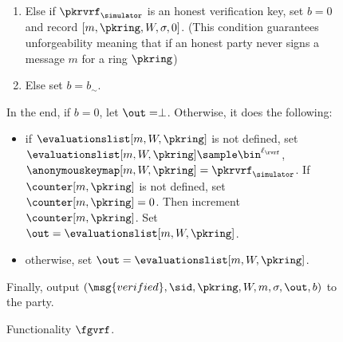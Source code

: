 \begin{figure}
\begin{tcolorbox}
{\begin{description}
\begin{enumerate}[label={{Cond.-} }{{\arabic*}}, start = 1]
					\item Else if $ \pkrvrf_\simulator $ is an honest verification key, set $ b = 0 $ and record $ [m, \pkring,W,\sigma, 0] $. (This condition guarantees unforgeability meaning that if an honest party never signs a message $ m $ for a ring $ \pkring $)\label{cond:forgery}
				\item Else set $ b = b_\sim$. \label{cond:simulatorbit}
				\end{enumerate}
				In the end, if $ b = 0 $, let $ \out = \perp $. Otherwise, it does the following:
				\begin{itemize}
					\item if $ \evaluationslist[m,W,\pkring] $ is not defined, set $ \evaluationslist[m, W, \pkring]\sample \bin^{\ell_\rvrf}$, $ \anonymouskeymap[m,W,\pkring]  =  \pkrvrf_\simulator$. If $ \counter[m, \pkring]  $ is not defined, set $ \counter[m, \pkring]  = 0 $. Then increment $ \counter[m, \pkring]  $. Set $ \out = \evaluationslist[m, W, \pkring]$. 	
					\item otherwise, set $ \out = \evaluationslist[m, W, \pkring]$. 	
				\end{itemize}
				Finally, output $(\msg{verified}, \sid, \pkring,W, m, \sigma, \out, b)$ to the party.
				
			\end{description}
		
			
		}
	\end{tcolorbox}
	\caption{Functionality $\fgvrf$.\label{f:gvrf}}
\end{figure}
	



